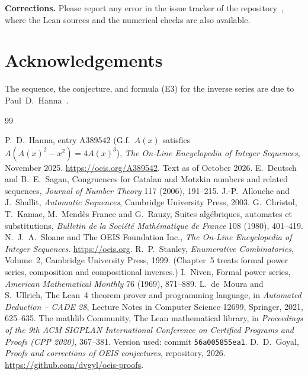 \documentclass[11pt,a4paper]{article}
\theoremstyle{definition}
\theoremstyle{remark}
\newcommand{\para}[1]{\par\medskip\noindent\textbf{#1}\enspace}
\begin{document}
\para{Corrections.} Please report any error in the issue tracker of the repository~\cite{repo}, where the Lean sources and the numerical checks are also
available.

\section*{Acknowledgements}
The sequence, the conjecture, and formula (E3) for the inverse series are due to Paul~D.~Hanna~\cite{oeis}.

\begin{thebibliography}{99}\small
\raggedright
{} P.~D.~Hanna, entry A389542 (G.f.\ $A(x)$ satisfies $A(A(x)^2-x^2)=4A(x)^3$), \emph{The On-Line Encyclopedia of Integer Sequences}, November 2025. \url{https://oeis.org/A389542}. Text as of October 2026.
 E.~Deutsch and B.~E.~Sagan, Congruences for Catalan and Motzkin numbers and related sequences, \emph{Journal of Number Theory} 117 (2006), 191--215.
 J.-P.~Allouche and J.~Shallit, \emph{Automatic Sequences}, Cambridge University Press, 2003.
 G.~Christol, T.~Kamae, M.~Mend\`es France and G.~Rauzy, Suites alg\'ebriques, automates et substitutions, \emph{Bulletin de la Soci\'et\'e Math\'ematique de France} 108 (1980), 401--419.
 N.~J.~A.~Sloane and The OEIS Foundation Inc., \emph{The On-Line Encyclopedia of Integer Sequences}. \url{https://oeis.org}.
 R.~P.~Stanley, \emph{Enumerative Combinatorics}, Volume~2, Cambridge University Press, 1999. (Chapter~5 treats formal power series, composition and compositional inverses.)
 I.~Niven, Formal power series, \emph{American Mathematical Monthly} 76 (1969), 871--889.
 L.~de~Moura and S.~Ullrich, The Lean~4 theorem prover and programming language, in \emph{Automated Deduction -- CADE 28}, Lecture Notes in Computer Science 12699, Springer, 2021, 625--635.
 The mathlib Community, The Lean mathematical library, in \emph{Proceedings of the 9th ACM SIGPLAN International Conference on Certified Programs and Proofs (CPP 2020)}, 367--381. Version used: commit \texttt{56a005855ea1}.
 D.~D.~Goyal, \emph{Proofs and corrections of OEIS conjectures}, repository, 2026. \url{https://github.com/dvgyl/oeis-proofs}.
\end{thebibliography}
\end{document}
